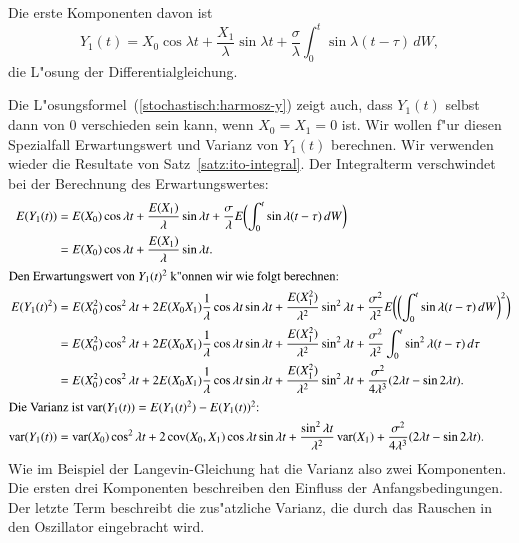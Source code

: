 Die erste Komponenten davon ist
\begin{equation}
Y_1(t)
=
X_0\cos\lambda t+\frac{X_1}{\lambda}\sin\lambda t
+
\frac{\sigma}{\lambda}\int_0^t\sin\lambda(t-\tau)\,dW,
\label{stochastisch:harmosz-y}
\end{equation}
die L"osung der Differentialgleichung.

Die L"osungsformel~(\ref{stochastisch:harmosz-y}) zeigt auch, dass
$Y_1(t)$ selbst dann von $0$ verschieden sein kann, wenn $X_0=X_1=0$ ist.
Wir wollen f"ur diesen Spezialfall Erwartungswert und Varianz 
von $Y_1(t)$ berechnen.
Wir verwenden wieder die Resultate von Satz~\ref{satz:ito-integral}.
Der Integralterm verschwindet bei der Berechnung des Erwartungswertes:
\begin{align*}
E(Y_1(t))
&=
E(X_0)\cos\lambda t
+
\frac{E(X_1)}{\lambda}\sin\lambda t
+
\frac{\sigma}{\lambda}E\biggl(\int_0^t\sin\lambda(t-\tau)\,dW\biggr)
\\
&=
E(X_0)\cos\lambda t+\frac{E(X_1)}{\lambda}\sin\lambda t.
\\
\intertext{Den Erwartungswert von $Y_1(t)^2$ k"onnen wir wie folgt berechnen:}
E(Y_1(t)^2)
&=
E(X_0^2)\cos^2\lambda t
+
2E(X_0X_1)\frac1{\lambda}\cos\lambda t\sin\lambda t
+
\frac{E(X_1^2)}{\lambda^2}\sin^2\lambda t
+
\frac{\sigma^2}{\lambda^2}E\biggl(
\biggl(\int_0^t\sin\lambda(t-\tau)\,dW\biggr)^2
\biggr)
\\
&=
E(X_0^2)\cos^2\lambda t
+
2E(X_0X_1)\frac1{\lambda}\cos\lambda t\sin\lambda t
+
\frac{E(X_1^2)}{\lambda^2}\sin^2\lambda t
+
\frac{\sigma^2}{\lambda^2}\int_0^t \sin^2\lambda(t-\tau)\,d\tau
\\
&=
E(X_0^2)\cos^2\lambda t
+
2E(X_0X_1)\frac1{\lambda}\cos\lambda t\sin\lambda t
+
\frac{E(X_1^2)}{\lambda^2}\sin^2\lambda t
+
\frac{\sigma^2}{4\lambda^3}
(2\lambda t -\sin 2\lambda t).
\\
\intertext{Die Varianz ist
$\operatorname{var}(Y_1(t))=E(Y_1(t)^2)-E(Y_1(t))^2$:}
\operatorname{var}(Y_1(t))
&=
\operatorname{var}(X_0)\cos^2\lambda t
+2\operatorname{cov}(X_0,X_1)\cos\lambda t\sin\lambda t
+
\frac{\sin^2\lambda t}{\lambda^2}\operatorname{var}(X_1)
+\frac{\sigma^2}{4\lambda^3}(2\lambda t-\sin2\lambda t).
\end{align*}
Wie im Beispiel der Langevin-Gleichung hat die Varianz
also zwei Komponenten.
Die ersten drei Komponenten beschreiben den Einfluss der Anfangsbedingungen.
Der letzte Term beschreibt die zus"atzliche Varianz, die durch
das Rauschen in den Oszillator eingebracht wird.

